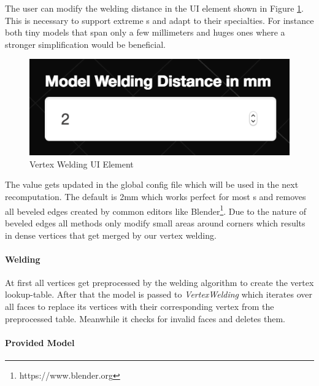 \documentclass[../ClassicThesis.tex]{subfiles}
\begin{document}


The user can modify the welding distance in the UI element shown in Figure \ref{fig:weldingUI}. This is necessary to support extreme {\threedmodel}s and adapt to their specialties. For instance both tiny models that span only a few millimeters and huges ones where a stronger simplification would be beneficial.


\begin{figure}
\includegraphics[width=0.5\columnwidth]{Images/04-approx-weldingUI.png}
\caption{Vertex Welding UI Element}
\label{fig:weldingUI}
\end{figure}

The value gets updated in the global config file which will be used in the next recomputation. The default is 2mm which works perfect for most {\threedmodel}s and removes all beveled edges created by common editors like Blender\footnote{https://www.blender.org}. Due to the nature of beveled edges all methods only modify small areas around corners which results in dense vertices that get merged by our vertex welding. 



\paragraph{Welding}

At first all vertices get preprocessed by the welding algorithm to create the vertex lookup-table. After that the model is passed to \emph{VertexWelding} which iterates over all faces to replace its vertices with their corresponding vertex from the preprocessed table. Meanwhile it checks for invalid faces and deletes them.

\paragraph{Provided Model}
\end{document}

